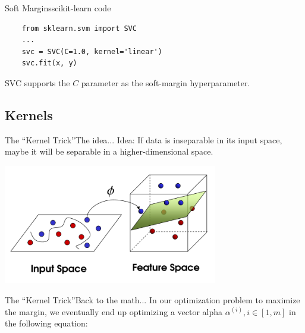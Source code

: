 \documentclass[xcolor=dvipsnames]{beamer}
\begin{document}
\begin{frame}[fragile]{Soft Margins}{scikit-learn code}
    \begin{lstlisting}
    from sklearn.svm import SVC
    ...
    svc = SVC(C=1.0, kernel='linear')
    svc.fit(x, y)
    \end{lstlisting}
    \vspace{2em}
    SVC supports the $C$ parameter as the soft-margin hyperparameter.
\end{frame}

\subsection{Kernels}

\begin{frame}{The ``Kernel Trick''}{The idea...}
    Idea: If data is inseparable in its input space, maybe it will be separable in a higher-dimensional space.
    \begin{center}
        \includegraphics[width=0.7\textwidth]{figs/kernel.png}
    \end{center}
\end{frame}

\begin{frame}{The ``Kernel Trick''}{Back to the math...}
    \vspace{1em}
    In our optimization problem to maximize the margin, we eventually end up optimizing a vector alpha $\alpha^{(i)}, i \in [1, m]$ in the following equation:
    \vspace{1em}
\end{frame}
\end{document}
